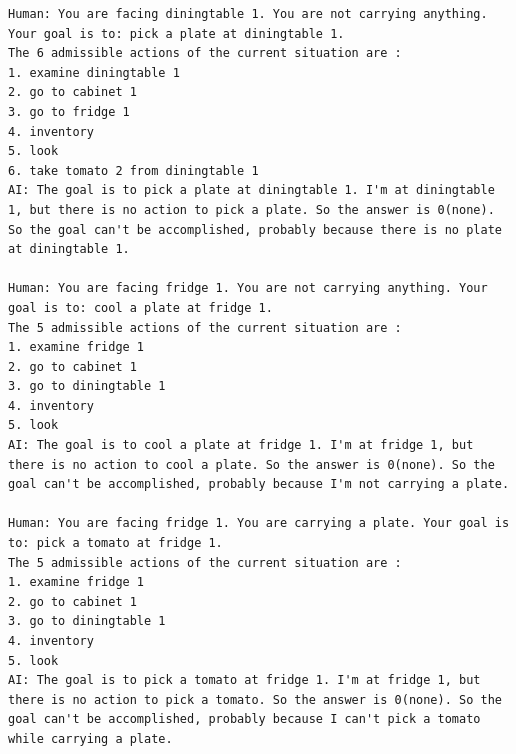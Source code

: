 \begin{lstlisting}
Human: You are facing diningtable 1. You are not carrying anything. Your goal is to: pick a plate at diningtable 1.
The 6 admissible actions of the current situation are :
1. examine diningtable 1
2. go to cabinet 1
3. go to fridge 1
4. inventory
5. look
6. take tomato 2 from diningtable 1
AI: The goal is to pick a plate at diningtable 1. I'm at diningtable 1, but there is no action to pick a plate. So the answer is 0(none). So the goal can't be accomplished, probably because there is no plate at diningtable 1.

Human: You are facing fridge 1. You are not carrying anything. Your goal is to: cool a plate at fridge 1.
The 5 admissible actions of the current situation are :
1. examine fridge 1
2. go to cabinet 1
3. go to diningtable 1
4. inventory
5. look
AI: The goal is to cool a plate at fridge 1. I'm at fridge 1, but there is no action to cool a plate. So the answer is 0(none). So the goal can't be accomplished, probably because I'm not carrying a plate.

Human: You are facing fridge 1. You are carrying a plate. Your goal is to: pick a tomato at fridge 1.
The 5 admissible actions of the current situation are :
1. examine fridge 1
2. go to cabinet 1
3. go to diningtable 1
4. inventory
5. look
AI: The goal is to pick a tomato at fridge 1. I'm at fridge 1, but there is no action to pick a tomato. So the answer is 0(none). So the goal can't be accomplished, probably because I can't pick a tomato while carrying a plate.
\end{lstlisting}
